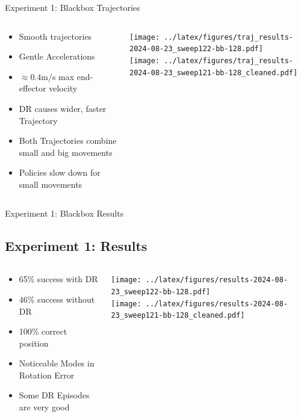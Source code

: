 \documentclass[16:9,en,navbarinfooter]{sdqbeamer}
\begin{document}
\begin{frame}{Experiment 1: Blackbox Trajectories}

	\begin{columns}[t]
		\begin{column}{0.3\textwidth}
			\vspace{1cm}
			\begin{itemize}
				\item Smooth trajectories
				\item Gentle Accelerations
				\item $\approx0.4$m/s max end-effector velocity
				\item DR causes wider, faster Trajectory
				\item Both Trajectories combine small and big movements
				\item Policies slow down for small movements
			\end{itemize}
		\end{column}
		\begin{column}{0.7\textwidth}
			\vspace{1cm}
			\texttt{[image: ../latex/figures/traj\_results-2024-08-23\_sweep122-bb-128.pdf]}\\
			\texttt{[image: ../latex/figures/traj\_results-2024-08-23\_sweep121-bb-128\_cleaned.pdf]}\\
		\end{column}
	\end{columns}
\end{frame}
\begin{frame}{Experiment 1: Blackbox Results}
	\subsection{Experiment 1: Results}

	\begin{columns}[t]
		\begin{column}{0.3\textwidth}
			\vspace{1cm}
			\begin{itemize}
				\item 65\% success with DR
				\item 46\% success without DR
				\item 100\% correct position
				\item Noticeable Modes in Rotation Error
				\item Some DR Episodes are very good
			\end{itemize}
		\end{column}
		\begin{column}{0.7\textwidth}
			\vspace{1cm}
			\texttt{[image: ../latex/figures/results-2024-08-23\_sweep122-bb-128.pdf]} \\
			\texttt{[image: ../latex/figures/results-2024-08-23\_sweep121-bb-128\_cleaned.pdf]}\\
		\end{column}
	\end{columns}
\end{frame}
\end{document}

